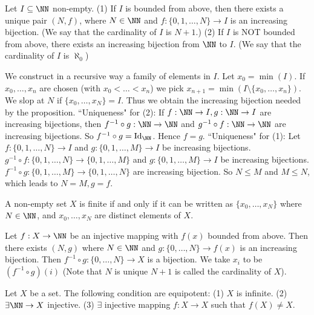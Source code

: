 \begin{propositionenv}
    Let $I\subseteq \NN$ non-empty.
    \newline
    (1) If $I$ is bounded from above,  then there exists a unique pair $(N, f)$,  where $N\in \NN$ and $f:\{0, 1, \dots, N\}\rightarrow I$ is an increasing bijection. (We say that the cardinality of $I$ is $N+1$.)
    \newline
    (2) If $I$ is NOT bounded from above,  there exists an increasing bijection from $\NN$ to $I$. (We say that the cardinality of $I$ is $\aleph_0$) 
\end{propositionenv}
\begin{proofenv}
    We construct in a recursive way a family of elements in $I$. Let $x_0=\min(I)$. If $x_0, \dots , x_n$ are chosen (with $x_0<\dots<x_n$) we pick $x_{n+1}=\min(I\setminus\{x_0, \dots, x_n\})$. We slop at $N$ if $\{x_0, \dots, x_N\}=I$. Thus we obtain the increasing bijection needed by the proposition.
    \newline
    ``Uniqueness" for (2): If $f:\NN\rightarrow I, g:\NN\rightarrow I$ are increasing bijections,  then $f^{-1}\circ g:\NN\rightarrow\NN$ and $g^{-1}\circ f:\NN\rightarrow\NN$ are increasing bijections. So $f^{-1}\circ g=\mathrm{Id}_{\NN}$. Hence $f=g$.
    \newline
    ``Uniqueness" for (1): Let $f:\{0, 1, \dots, N\}\rightarrow I$ and $g:\{0, 1, \dots, M\}\rightarrow I$ be increasing bijections. $g^{-1}\circ f:\{0, 1, \dots, N\}\rightarrow \{0, 1, \dots,  M\}$ and $g:\{0, 1, \dots, M\}\rightarrow I$ be increasing bijections. $f^{-1}\circ g:\{0, 1, \dots, M\}\rightarrow \{0, 1, \dots,  N\}$ are increasing bijection. So $N\le M$ and $M\le N$,  which leads to $N=M, g=f$. 
\end{proofenv}
\begin{corollaryenv}
    A non-empty set $X$ is finite if and only if it can be written as $\{x_0, \dots, x_N\}$ where $N\in \NN$,  and $x_0, \dots, x_N$ are distinct elements of $X$.
\end{corollaryenv}
\begin{proofenv}
    Let $f:X\rightarrow \NN$ be an injective mapping with $f(x)$ bounded from above. Then there exists $(N, g)$ where $N\in \NN$ and $g:\{0, \dots , N\}\rightarrow f(x)$ is an increasing bijection. Then $f^{-1}\circ g:\{0, \dots, N\}\rightarrow X$ is a bijection. We take $x_i$ to be $(f^{-1}\circ g)(i)$ (Note that $N$ is unique $N+1$ is called the cardinality of $X$).
\end{proofenv}
\begin{propositionenv}
    Let $X$ be a set. The following condition are equipotent:
    \newline
    (1) $X$ is infinite.
    \newline
    (2) $\exists \NN\rightarrow X$ injective.
    \newline
    (3) $\exists$ injective mapping $f:X\rightarrow X$ such that $f(X)\not=X$.
\end{propositionenv}
